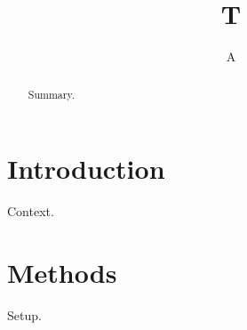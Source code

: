 \documentclass{article}
\begin{document}
\title{T}\author{A}
\begin{abstract}Summary.\end{abstract}
\maketitle
\section{Introduction}Context.
\section{Methods}Setup.

\end{document}
